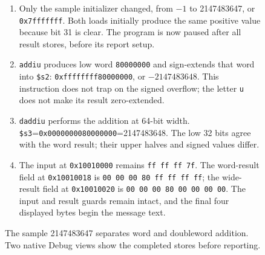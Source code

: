 \begin{figure}[htbp]
  \par\smallskip
  \begin{minipage}{\linewidth}
    \small
    \begin{enumerate}
      \item Only the sample initializer changed, from $-1$ to 2147483647, or \texttt{0x7fffffff}. Both loads initially produce the same positive value because bit 31 is clear. The program is now paused after all result stores, before its report setup.
      \item \texttt{addiu} produces low word \texttt{80000000} and sign-extends that word into \texttt{\$s2}: \texttt{0xffffffff80000000}, or $-2147483648$. This instruction does not trap on the signed overflow; the letter \texttt{u} does not make its result zero-extended.
      \item \texttt{daddiu} performs the addition at 64-bit width. \texttt{\$s3}=\texttt{0x0000000080000000}=2147483648. The low 32 bits agree with the word result; their upper halves and signed values differ.
      \item The input at \texttt{0x10010000} remains \texttt{ff ff ff 7f}. The word-result field at \texttt{0x10010018} is \texttt{00 00 00 80 ff ff ff ff}; the wide-result field at \texttt{0x10010020} is \texttt{00 00 00 80 00 00 00 00}. The input and result guards remain intact, and the final four displayed bytes begin the message text.
    \end{enumerate}
  \end{minipage}
  \caption{The sample 2147483647 separates word and doubleword addition. Two native Debug views show the completed stores before reporting.}
  \label{capture:004-bit-inspector-f04-width-boundary}
\end{figure}
\par
